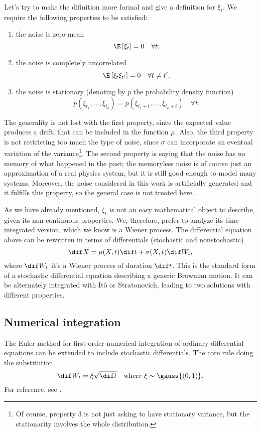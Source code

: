 Let's try to make the difinition more formal and give a definition for \(\xi_t\). 
We require the following properties to be satisfied:
\begin{enumerate}
  \item the noise is zero-mean \[\E\left[\xi_t\right] = 0 \quad \forall t;\]
  \item the noise is completely uncorrelated  \[\E\left[\xi_t\xi_{t'}\right] = 0 \quad \forall t\neq t';\]
  \item the noise is stationary (denoting by \(p\) the probability density function)
        \[p{(\xi_{t_1},\dots,\xi_{t_k})} = p{(\xi_{t_1 + t},\dots,\xi_{t_k + t})} \quad \forall t.\]
\end{enumerate}
The generality is not lost with the first property, since the expected value produces a drift,
that can be included in the function \(\mu\). Also, the third property is not restricting too much 
the type of noise, since \(\sigma\) can incorporate an eventual variation of the variance\footnote{
  Of course, property 3 is not just asking to have stationary variance, but the stationarity
  involves the whole distribution.
}. The second property is saying that the noise has no memory of what happened in the past;
the memoryless noise is of course just an approximation of a real physics system, but it is still
good enough to model many systems. Moreover, the noise considered in this work is artificially 
generated and it fulfills this property, so the general case is not treated here.

As we have already mentioned, \(\xi_t\) is not an easy mathematical object to describe, given its non-continuous properties. We, therefore, prefer to analyze its time-integrated version, which we know is a Wiener process.
The differential equation above can be rewritten in terms of differentials (stochastic and nonstochastic) 
\[\dif X = \mu{(X,t)}\dif t + \sigma{(X,t)}\dif W_t,\]
where \(\dif W_t\) it's a Wiener process of duration \(\dif t\).
This is the standard form of a stochastic differential equation describing a generic Brownian motion. It can be alternately integrated with Itô or Stratonovich, leading to two solutions with different properties.


\subsection{Numerical integration}
The Euler method for first-order numerical integration of ordinary differential equations can be extended to include stochastic differentials.
The core rule doing the substitution
\[
  \dif W_t = \xi \sqrt{\dif t} \quad \text{where } \xi \sim \gauss{(0,1)}.
\]
For reference, see \cite{wiki2022euler}.

